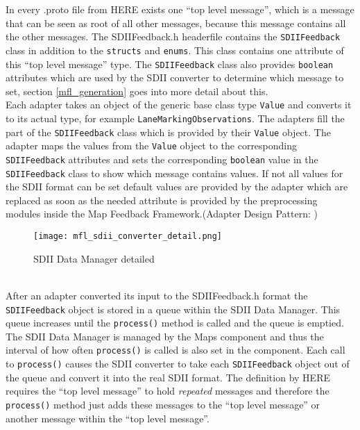 In every .proto file from HERE exists one \enquote{top level message}, which is a message that can be seen as root of all other messages, because this message contains all the other messages. The SDIIFeedback.h headerfile contains the \verb|SDIIFeedback| class in addition to the \verb|structs| and \verb|enums|. This class contains one attribute of this \enquote{top level message} type. The \verb|SDIIFeedback| class also provides \verb|boolean| attributes which are used by the SDII converter to determine which message to set, section \ref{mfl_generation} goes into more detail about this.\\
Each adapter takes an object of the generic base class type \verb|Value| and converts it to its actual type, for example \verb|LaneMarkingObservations|. The adapters fill the part of the \verb|SDIIFeedback| class which is provided by their \verb|Value| object. The adapter maps the values from the \verb|Value| object to the corresponding \verb|SDIIFeedback| attributes and sets the corresponding \verb|boolean| value in the \verb|SDIIFeedback| class to show which message contains values. If not all values for the SDII format can be set default values are provided by the adapter which are replaced as soon as the needed attribute is provided by the preprocessing modules inside the Map Feedback Framework.(Adapter Design Pattern: \cite{gof:1994})
\begin{figure}[!hbt]
\texttt{[image: mfl\_sdii\_converter\_detail.png]}
\caption{SDII Data Manager detailed}
\label{mfl_extended_detail}
\end{figure}
\\After an adapter converted its input to the SDIIFeedback.h format the \verb|SDIIFeedback| object is stored in a queue within the SDII Data Manager. This queue increases until the \verb|process()| method is called and the queue is emptied. The SDII Data Manager is managed by the Maps component and thus the interval of how often \verb|process()| is called is also set in the component. Each call to \verb|process()| causes the SDII converter to take each \verb|SDIIFeedback| object out of the queue and convert it into the real SDII format. The definition by HERE requires the \enquote{top level message} to hold \emph{repeated} messages and therefore the \verb|process()| method just adds these messages to the \enquote{top level message} or another message within the \enquote{top level message}.\\
